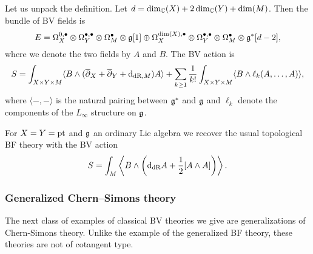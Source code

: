 \documentclass[10pt, oneside]{article}
\begin{document}
Let us unpack the definition. Let $d = \dim_\mathbb C(X) + 2\dim_\mathbb C(Y) + \dim(M)$. Then the bundle of BV fields is
\[E = \Omega^{0,\bullet}_X \otimes \Omega^{\bullet,\bullet}_Y \otimes \Omega^\bullet_M \otimes \mathfrak g[1]\oplus \Omega^{\dim(X),\bullet}_X \otimes \Omega^{\bullet,\bullet}_Y \otimes \Omega^\bullet_M\otimes \mathfrak g^*[d-2],\]
where we denote the two fields by $A$ and $B$. The BV action is
\[S = \int_{X\times Y\times M} \langle B\wedge (\overline{\partial}_X + \overline{\partial}_Y + {\rm d}_{\mathrm{dR}, M}) A\rangle + \sum_{k\geq 1}\frac{1}{k!} \int_{X\times Y\times M} \langle B\wedge \ell_k(A, \dots, A)\rangle,\]
where $\langle -, -\rangle$ is the natural pairing between $\mathfrak g^*$ and $\mathfrak g$ and $\ell_k$ denote the components of the $L_\infty$ structure on $\mathfrak g$.

\begin{example}
For $X=Y=\operatorname{pt}$ and $\mathfrak g$ an ordinary Lie algebra we recover the usual topological BF theory with the BV action
\[S = \int_M \left\langle B\wedge \left({\rm d}_{\mathrm{dR}} A+ \frac{1}{2}[A\wedge A]\right)\right\rangle.\]
\end{example}

\subsubsection{Generalized Chern--Simons theory}

The next class of examples of classical BV theories we give are generalizations of Chern-Simons theory. Unlike the example of the generalized BF theory, these theories are not of cotangent type.
\end{document}
